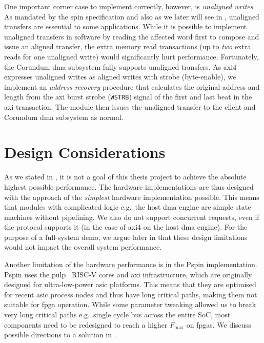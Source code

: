 One important corner case to implement correctly, however, is \emph{unaligned writes}.  As mandated by the \ac{spin} specification and also as we later will see in , unaligned transfers are essential to some applications.  While it is possible to implement unaligned transfers in software by reading the affected word first to compose and issue an aligned transfer, the extra memory read transactions (up to \emph{two} extra reads for one unaligned write) would significantly hurt performance.  Fortunately, the Corundum \ac{dma} subsystem fully supports unaligned transfers.  As \ac{axi}4 expresses unaligned writes as aligned writes with strobe (byte-enable), we implement an \emph{address recovery} procedure that calculates the original address and length from the \ac{axi} burst strobe (\texttt{WSTRB}) signal of the first and last beat in the \ac{axi} transaction.  The module then issues the unaligned transfer to the client and Corundum \ac{dma} subsystem as normal.

\section{Design Considerations} \label{sec:hw-design-considerations}

As we stated in , it is not a goal of this thesis project to achieve the absolute highest possible performance.  The hardware implementations are thus designed with the approach of the \emph{simplest} hardware implementation possible.  This means that modules with complicated logic e.g.\ the host \ac{dma} engine are simple state machines without pipelining.  We also do not support concurrent requests, even if the protocol supports it (in the case of \ac{axi}4 on the host \ac{dma} engine).  For the purpose of a full-system demo, we argue later in  that these design limitations would not impact the overall system performance.

Another limitation of the hardware performance is in the P\acs{spin} implementation.  P\acs{spin} uses the \ac{pulp}~\cite{rossi_pulp_2015} RISC-V cores and \ac{axi} infrastructure, which are originally designed for ultra-low-power \ac{asic} platforms.  This means that they are optimised for recent \ac{asic} process nodes and thus have long critical paths, making them not suitable for \ac{fpga} operation.  While some parameter tweaking allowed us to break very long critical paths e.g.\ single cycle bus across the entire SoC, most components need to be redesigned to reach a higher $F_{\text{max}}$ on \ac{fpga}s.  We discuss possible directions to a solution in .

